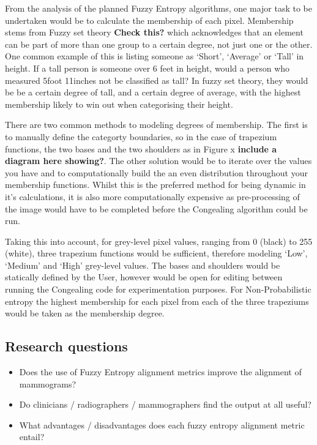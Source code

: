 From the analysis of the planned Fuzzy Entropy algorithms, one major task to be undertaken would be to calculate the membership of each pixel. Membership stems from Fuzzy set theory \textbf{Check this?} which acknowledges that an element can be part of more than one group to a certain degree, not just one or the other. One common example of this is listing someone as `Short', `Average' or `Tall' in height. If a tall person is someone over 6 feet in height, would a person who measured 5foot 11inches not be classified as tall? In fuzzy set theory, they would be be a certain degree of tall, and a certain degree of average, with the highest membership likely to win out when categorising their height.

There are two common methods to modeling degrees of membership. The first is to manually define the categorty boundaries, so in the case of trapezium functions, the two bases and the two shoulders as in Figure x \textbf{include a diagram here showing?}. The other solution would be to iterate over the values you have and to computationally build the an even distribution throughout your membership functions. Whilst this is the preferred method for being dynamic in it's calculations, it is also more computationally expensive as pre-processing of the image would have to be completed before the Congealing algorithm could be run.

Taking this into account, for grey-level pixel values, ranging from 0 (black) to 255 (white), three trapezium functions would be sufficient, therefore modeling `Low', `Medium' and `High' grey-level values. The bases and shoulders would be statically defined by the User, however would be open for editing between running the Congealing code for experimentation purposes. For Non-Probabilistic entropy the highest membership for each pixel from each of the three trapeziums would be taken as the membership degree.

\subsection{Research questions}
\begin{itemize}
\item Does the use of Fuzzy Entropy alignment metrics improve the alignment of mammograms?
\item Do clinicians / radiographers / mammographers find the output at all useful?
\item What advantages / disadvantages does each fuzzy entropy alignment metric entail?
\end{itemize}
